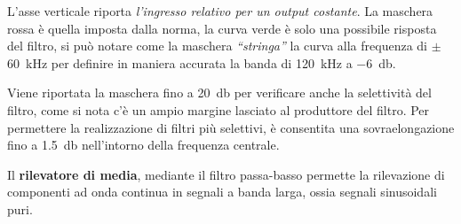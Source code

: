 L'asse verticale riporta \textit{l'ingresso relativo per un output costante}.
La maschera rossa è quella imposta dalla norma, la curva verde è solo
una possibile risposta del filtro, si può notare come la maschera
\textit{``stringa''} la curva alla frequenza di $\pm$ \SI{60}{\kilo\hertz}
per definire in maniera accurata la banda di \SI{120}{\kilo\hertz} a \SI{-6}{\decibel}.

Viene riportata la maschera fino a \SI{20}{\decibel} per verificare anche la selettività
del filtro, come si nota c'è un ampio margine lasciato al produttore del filtro.
Per permettere la realizzazione di filtri più selettivi, è consentita
una sovraelongazione fino a \SI{1.5}{\decibel} nell'intorno della frequenza centrale.

Il \textbf{rilevatore di media}, mediante il filtro passa-basso permette la rilevazione di componenti ad onda
continua in segnali a banda larga, ossia segnali sinusoidali puri.
